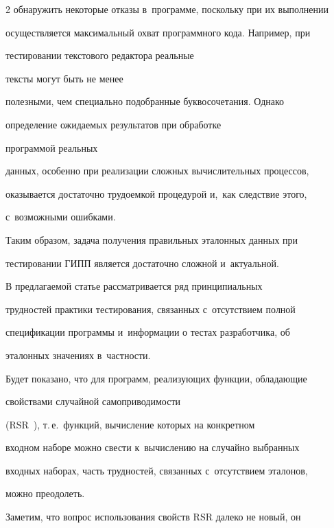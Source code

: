 \begin{multicols}{2}
обнаружить некоторые отказы в~программе, поскольку при их выполнении 


осуществляется максимальный охват программного кода. Например, при 


тестировании текстового редактора реальные\linebreak


 тексты могут быть не менее 


полезными, чем специально подобранные буквосочетания. Однако 


определение ожидаемых результатов при обработке\linebreak


 программой реальных 


данных, особенно при реализации сложных вычислительных процессов, 


оказывается достаточно трудоемкой процедурой и,~как следствие этого, 


с~возможными ошибками.


    


    Таким образом, задача получения правильных эталонных данных при 


тестировании ГИПП является достаточно сложной и~актуальной.


    


    В предлагаемой статье рассматривается ряд принципиальных 


трудностей практики тестирования, связанных с~отсутствием полной 


спецификации программы и~информации о тестах разработчика, об 


эталонных значениях в~частности.


    


    Будет показано, что для программ, реа\-ли\-зу\-ющих функции, обладающие 


свойствами случайной самоприводимости 


(RSR~\cite{5-bf}), т.\,е.\ функций, вычисление которых на конкретном 


входном наборе можно свести к~вы\-чис\-ле\-нию на случайно выбранных 


входных наборах, часть трудностей, связанных с~отсутствием эталонов, 


можно преодолеть.


    


    Заметим, что вопрос использования свойств RSR далеко не новый, он 



\end{multicols}
